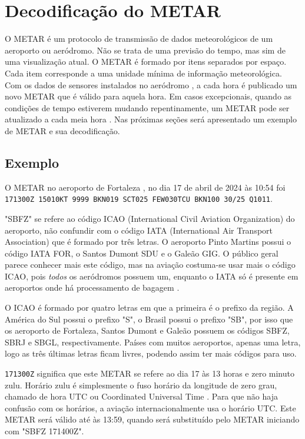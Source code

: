\chapter{Decodificação do METAR}

O METAR é um protocolo de transmissão de dados meteorológicos de um aeroporto ou aeródromo. Não se trata de 
uma previsão do tempo, mas sim de uma visualização atual. O METAR é formado por itens separados por espaço. 
Cada item corresponde a uma unidade mínima de informação meteorológica. Com os dados de sensores instalados 
no aeródromo \cite{metar-weather-gov}, a cada hora é publicado um novo METAR que é válido para aquela hora. 
Em casos excepcionais, quando as condições de tempo estiverem mudando repentinamente, um METAR pode ser atualizado 
a cada meia hora \cite{METAR-speci}. Nas próximas seções será apresentado um exemplo de METAR e sua 
decodificação.

\section{Exemplo}
O METAR no aeroporto de Fortaleza \cite{METAR-sbfz}, no dia 17 de abril de 2024 às 10:54 foi
\texttt{171300Z 15010KT 9999 BKN019 SCT025 FEW030TCU BKN100 30/25 Q1011}.

"SBFZ" se refere ao código ICAO (International Civil Aviation Organization) do aeroporto, não confundir 
com o código IATA (International Air Transport Association) que é formado por três letras. O aeroporto Pinto 
Martins possui o código IATA FOR, o Santos Dumont SDU e o Galeão GIG. O público geral parece conhecer mais este 
código, mas na aviação costuma-se usar mais o código ICAO, pois \textit{todos} os aeródromos possuem um, 
enquanto o IATA só é presente em aeroportos onde há processamento de bagagem \cite{iata-codes} \cite{icao-codes}.

O ICAO é formado por quatro letras em que a primeira é o prefixo da região. A América do Sul possui o prefixo "S", 
o Brasil possui o prefixo "SB", por isso que os aeroporto de Fortaleza, Santos Dumont e Galeão possuem os códigos 
SBFZ, SBRJ e SBGL, respectivamente. Países com muitos aeroportos, apenas uma letra, 
logo as três últimas letras ficam livres, podendo assim ter mais códigos para uso.

\texttt{171300Z} significa que este METAR se refere ao dia 17 às 13 horas e zero minuto zulu. Horário zulu é 
simplesmente o fuso horário da longitude de zero grau, chamado de hora UTC ou Coordinated Universal Time \cite{UTC}. 
Para que não haja confusão com os horários, a aviação internacionalmente usa o horário UTC. Este METAR será 
válido até às 13:59, quando será substituído pelo METAR iniciando com "SBFZ 171400Z".


